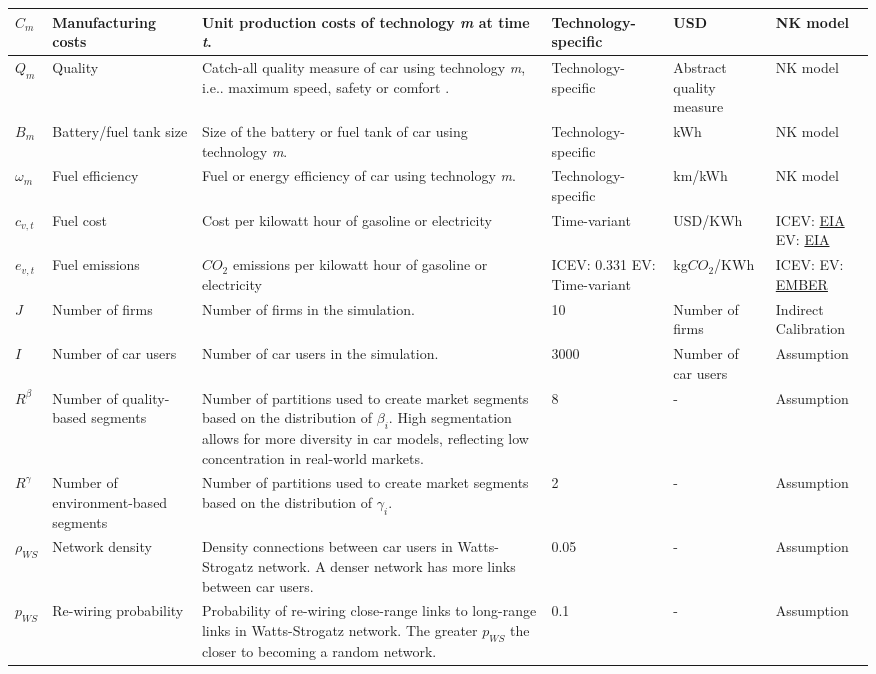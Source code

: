 \documentclass[12pt]{article}
\begin{document}
\begin{longtable}{p{}p{}p{}p{}p{}p{}}
		\hline
		$C_{m}$ & Manufacturing costs & Unit production costs of technology \textit{m} at time \textit{t}. & Technology-specific  & USD & NK model \\
		\hline
		$Q_{m}$ & Quality & Catch-all quality measure of car using technology \textit{m}, i.e.. maximum speed, safety or comfort \citep{neves_technological_2019, singh_review_2020}.  & Technology-specific & Abstract quality measure & NK model \\
		\hline
		$B_{m}$ & Battery/fuel tank size & Size of the battery or fuel tank of car using technology \textit{m}. & Technology-specific & kWh & NK model \\
		\hline
		$\omega_{m}$ & Fuel efficiency & Fuel or energy efficiency of car using technology \textit{m}. & Technology-specific & km/kWh & NK model \\
		\hline
		$c_{v,t}$ & Fuel cost & Cost per kilowatt hour of gasoline or electricity & Time-variant & USD/KWh & ICEV: \href{https://www.eia.gov/petroleum/gasdiesel/}{EIA} EV: \href{https://www.eia.gov/opendata/browser/electricity/retail-sales}{EIA}  \\
		\hline
		$e_{v,t}$ & Fuel emissions & $CO_2$ emissions per kilowatt hour of gasoline or electricity & ICEV: 0.331 EV: Time-variant & kg$CO_2$/KWh & ICEV: \citep[Table 10.8]{ipcc2022transport} EV: \href{https://ember-energy.org/data/us-electricity-data-explorer/}{EMBER}  \\
		\hline
		$J$ & Number of firms & Number of firms in the simulation. & 10 & Number of firms & Indirect Calibration\\
		\hline
		$I$ & Number of car users & Number of car users in the simulation. & 3000 & Number of car users & Assumption \\
		\hline
		$R^\beta$ & Number of quality-based segments & Number of partitions used to create market segments based on the distribution of $\beta_i$. High segmentation allows for more diversity in car models, reflecting low concentration in real-world markets. & 8 & - & Assumption \\
		\hline
		$R^\gamma$ & Number of environment-based segments & Number of partitions used to create market segments based on the distribution of $\gamma_i$. & 2 & - & Assumption \\
		\hline
		$\rho_{WS}$  & Network density & Density connections between car users in Watts-Strogatz network. A denser network has more links between car users. & 0.05 & - & Assumption \\
		\hline
		$p_{WS}$  & Re-wiring probability & Probability of re-wiring close-range links to long-range links in Watts-Strogatz network. The greater $p_{WS}$ the closer to becoming a random network. & 0.1 & - & Assumption \\
		\hline
	\end{longtable}
\end{document}
